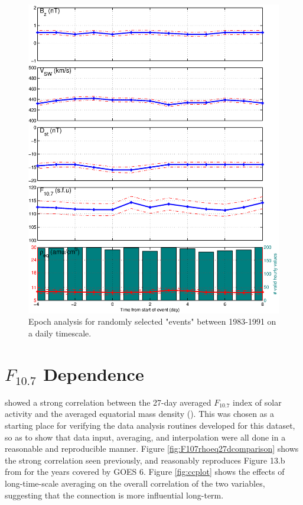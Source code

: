 \begin{figure}[htp!]
	\centering
	\includegraphics[width=1\linewidth]{Figures/StormAvs/stormavs-randomdaily-GOES6}
	\caption{Epoch analysis for randomly selected "events" between 1983-1991 on a daily timescale.}
	\label{fig:EpochRandomDaily}
\end{figure}



\section{$F_{10.7}$ Dependence} \label{sec:f107dep}
\cite{Takahashi2010SolarCycleVariation} showed a strong correlation between the 27-day averaged $F_{10.7}$ index of solar activity and the averaged equatorial mass density (\req). This was chosen as a starting place for verifying the data analysis routines developed for this dataset, so as to show that data input, averaging, and interpolation were all done in a reasonable and reproducible manner. Figure \ref{fig:F107rhoeq27dcomparison} shows the strong correlation seen previously, and reasonably reproduces Figure 13.b from \cite{Takahashi2010SolarCycleVariation} for the years covered by GOES 6. Figure \ref{fig:ccplot} shows the effects of long-time-scale averaging on the overall correlation of the two variables, suggesting that the connection is more influential long-term.


